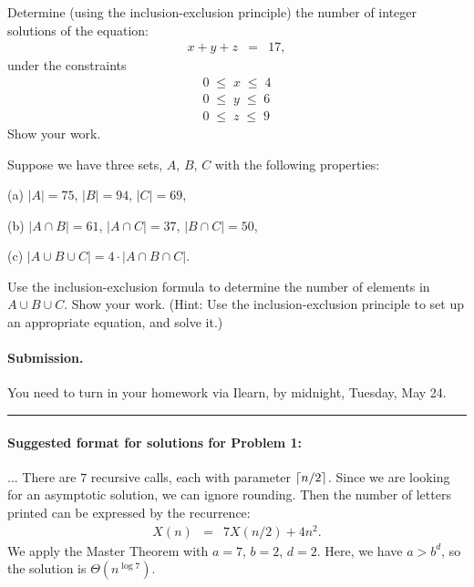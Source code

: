 \documentclass{article}
\begin{document}

\begin{problem}
Determine (using the inclusion-exclusion principle)
the number of integer solutions of the equation:
%
\begin{eqnarray*}
x + y + z &=& 17,
\end{eqnarray*}
%
under the constraints 
%
\begin{eqnarray*}
        0 \;\le\; x \;\le\; 4 \\
        0 \;\le\; y \;\le\; 6 \\
        0\;\le\; z  \;\le\; 9
\end{eqnarray*}
%
Show your work.
\end{problem}


\begin{problem}
Suppose we have three sets, $A$, $B$, $C$
with the following properties:

\begin{description}

\item{(a)} $|A| = 75$, $|B| = 94$,
                $|C| = 69$,

\item{(b)} $|A\cap B| = 61$,
        $|A\cap C| = 37$,
        $|B\cap C| = 50$,

\item{(c)}
$|A\cup B\cup C| = 4\cdot|A\cap B\cap C|$.

\end{description}

Use the inclusion-exclusion formula to
determine the number of elements in $A\cup B\cup C$.
Show your work.
(Hint: Use the inclusion-exclusion principle to
set up an appropriate equation, and solve it.)
\end{problem}


\vskip 0.1in
\paragraph{Submission.}
You need to turn in your homework via Ilearn, by midnight,
Tuesday, May 24. 

\vskip 0.5in

\noindent
\hrule


\vskip 0.3in

\paragraph{Suggested format for solutions for Problem 1:}
 ... There are $7$ recursive calls, each with parameter ${\left\lceil n/2\right\rceil}$. Since
we are looking for an asymptotic solution, we can ignore rounding. Then
the number of letters printed can be expressed by the recurrence:
%
\begin{eqnarray*}
	X(n) &=& 7 X(n/2) + 4n^2.
\end{eqnarray*}
%
We apply the Master Theorem with $a = 7$, $b = 2$, $d = 2$. Here, we
have $a > b^d$, so the solution is $\Theta(n^{\log 7})$.
\end{document}
